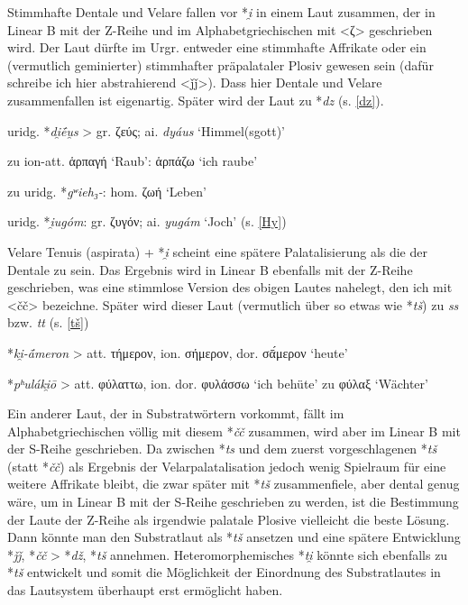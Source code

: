 \documentclass[12pt,a4paper,normalheadings,bibliography=totoc]{scrartcl}
\def\rek#1{\mbox{*\textit{#1}}}
\def\bel#1{\mbox{\textit{#1}}}
\def\i#1{\mbox{\textit{#1}}}
\begin{document}
Stimmhafte Dentale und Velare fallen vor \rek{i̯} in einem Laut zusammen,
der in Linear B mit der Z-Reihe und im Alphabetgriechischen mit <ζ>
geschrieben wird.
Der Laut dürfte im Urgr. entweder eine stimmhafte Affrikate oder ein
(vermutlich geminierter) stimmhafter präpalataler Plosiv gewesen sein
(dafür schreibe ich hier abstrahierend <ǰǰ>).
Dass hier Dentale und Velare zusammenfallen ist eigenartig.
Später wird der Laut zu \rek{dz} (s. \ref{dz}).

\lex{(\i{d}, \i{g})\i{i̯}}{\i{ǰǰ}}

uridg. \rek{di̯ḗu̯s} > gr. ζεύς; ai. \bel{dyáus} `Himmel(sgott)'

zu ion-att. ἁρπαγή `Raub': ἁρπάζω `ich raube'

zu uridg. \rek{gʷieh₃-}: hom. ζωή `Leben'

uridg. \rek{i̯ugóm}: gr. ζυγόν; ai. \bel{yugám} `Joch' (s. \ref{Hy})

\bigskip\noindent
Velare Tenuis (aspirata) + \rek{i̯} scheint eine spätere Palatalisierung
als die der Dentale zu sein.
Das Ergebnis wird in Linear B ebenfalls mit der Z-Reihe geschrieben,
was eine stimmlose Version des obigen Lautes nahelegt,
den ich mit <čč> bezeichne.
Später wird dieser Laut (vermutlich über so etwas wie \rek{tš})
zu \bel{ss} bzw. \bel{tt} (s. \ref{tš})

\lex{(\i{k}, \i{kʰ})\i{i̯}}{\i{čč}}

\rek{ki̯-ā́meron} > att. τήμερον, ion. σήμερον, dor. σᾱ́μερον `heute'

\rek{pʰuláki̯ō} > att. φύλαττω, ion. dor. φυλάσσω `ich behüte' zu φύλαξ `Wächter'

\bigskip\noindent
Ein anderer Laut, der in Substratwörtern vorkommt,
fällt im Alphabetgriechischen völlig mit diesem \rek{čč} zusammen,
wird aber im Linear B mit der S-Reihe geschrieben.
Da zwischen \rek{ts} und dem zuerst vorgeschlagenen \rek{tš} (statt \rek{čč})
als Ergebnis
der Velarpalatalisation jedoch wenig Spielraum für eine weitere Affrikate bleibt,
die zwar später mit \rek{tš} zusammenfiele, aber dental genug wäre,
um in Linear B mit der S-Reihe geschrieben zu werden,
ist die Bestimmung der Laute der Z-Reihe als irgendwie palatale Plosive
vielleicht die beste Lösung.
Dann könnte man den Substratlaut als \rek{tš} ansetzen
und eine spätere Entwicklung \rek{ǰǰ}, \rek{čč} > \rek{dž}, \rek{tš} annehmen.
Heteromorphemisches \rek{ti̯} könnte sich ebenfalls zu \rek{tš} entwickelt
und somit die Möglichkeit der Einordnung des Substratlautes in das
Lautsystem überhaupt erst ermöglicht haben.
\end{document}
